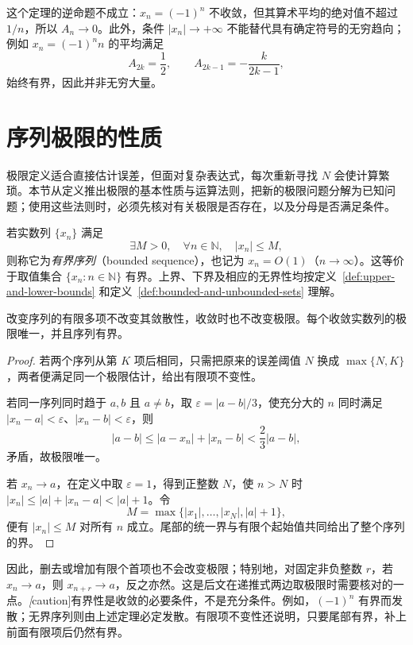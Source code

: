 这个定理的逆命题不成立：$x_n=(-1)^n$ 不收敛，但其算术平均的绝对值不超过 $1/n$，所以 $A_n\to0$。此外，条件 $|x_n|\to+\infty$ 不能替代具有确定符号的无穷趋向；例如 $x_n=(-1)^n n$ 的平均满足
\[
    A_{2k}=\frac12,\qquad A_{2k-1}=-\frac{k}{2k-1},
\]
始终有界，因此并非无穷大量。

\section{序列极限的性质}
\label{sec:properties-of-sequence-limits}

极限定义适合直接估计误差，但面对复杂表达式，每次重新寻找 $N$ 会使计算繁琐。本节从定义推出极限的基本性质与运算法则，把新的极限问题分解为已知问题；使用这些法则时，必须先核对有关极限是否存在，以及分母是否满足条件。

\begin{definition}
\label{def:bounded-sequence}
若实数列 $\{x_n\}$ 满足
\[
    \exists M>0,\quad\forall n\in\mathbb{N},\quad |x_n|\leq M,
\]
则称它为\emph{有界序列}（bounded sequence），也记为 $x_n=O(1)$（$n\to\infty$）。这等价于取值集合 $\{x_n:n\in\mathbb{N}\}$ 有界。上界、下界及相应的无界性均按定义~\ref{def:upper-and-lower-bounds} 和定义~\ref{def:bounded-and-unbounded-sets} 理解。
\end{definition}

\begin{theorem}
\label{thm:basic-properties-of-sequence-limits}
改变序列的有限多项不改变其敛散性，收敛时也不改变极限。每个收敛实数列的极限唯一，并且序列有界。
\end{theorem}

\begin{proof}
若两个序列从第 $K$ 项后相同，只需把原来的误差阈值 $N$ 换成 $\max\{N,K\}$，两者便满足同一个极限估计，给出有限项不变性。

若同一序列同时趋于 $a,b$ 且 $a\neq b$，取 $\varepsilon=|a-b|/3$，使充分大的 $n$ 同时满足 $|x_n-a|<\varepsilon$、$|x_n-b|<\varepsilon$，则
\[
    |a-b|\leq|a-x_n|+|x_n-b|<\frac23|a-b|,
\]
矛盾，故极限唯一。

若 $x_n\to a$，在定义中取 $\varepsilon=1$，得到正整数 $N$，使 $n>N$ 时 $|x_n|\leq|a|+|x_n-a|<|a|+1$。令
\[
    M=\max\{|x_1|,\ldots,|x_N|,|a|+1\},
\]
便有 $|x_n|\leq M$ 对所有 $n$ 成立。尾部的统一界与有限个起始值共同给出了整个序列的界。
\end{proof}

因此，删去或增加有限个首项也不会改变极限；特别地，对固定非负整数 $r$，若 $x_n\to a$，则 $x_{n+r}\to a$，反之亦然。这是后文在递推式两边取极限时需要核对的一点。\emph[caution]{有界性是收敛的必要条件，不是充分条件。}例如，$(-1)^n$ 有界而发散；无界序列则由上述定理必定发散。有限项不变性还说明，只要尾部有界，补上前面有限项后仍然有界。

